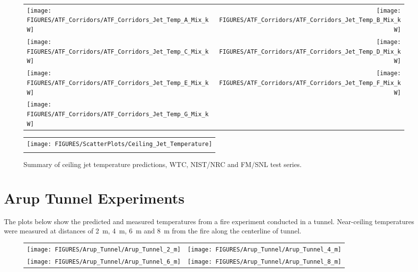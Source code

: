 \begin{figure}[p]
\begin{tabular*}{\textwidth}{l@{\extracolsep{\fill}}r}
\texttt{[image: FIGURES/ATF\_Corridors/ATF\_Corridors\_Jet\_Temp\_A\_Mix\_kW]} &
\texttt{[image: FIGURES/ATF\_Corridors/ATF\_Corridors\_Jet\_Temp\_B\_Mix\_kW]} \\
\texttt{[image: FIGURES/ATF\_Corridors/ATF\_Corridors\_Jet\_Temp\_C\_Mix\_kW]} &
\texttt{[image: FIGURES/ATF\_Corridors/ATF\_Corridors\_Jet\_Temp\_D\_Mix\_kW]} \\
\texttt{[image: FIGURES/ATF\_Corridors/ATF\_Corridors\_Jet\_Temp\_E\_Mix\_kW]} &
\texttt{[image: FIGURES/ATF\_Corridors/ATF\_Corridors\_Jet\_Temp\_F\_Mix\_kW]} \\
\texttt{[image: FIGURES/ATF\_Corridors/ATF\_Corridors\_Jet\_Temp\_G\_Mix\_kW]} &
\end{tabular*}
\label{ATF_Corridors_Jet_Temp_Mix_kW}
\end{figure}





\begin{figure}[p]
\begin{center}
\begin{tabular}{c}
\texttt{[image: FIGURES/ScatterPlots/Ceiling\_Jet\_Temperature]} \\
\vspace{0.25in}
\end{tabular}
\end{center}
\caption[Summary of ceiling jet temperature predictions, WTC, NIST/NRC and FM/SNL test series.]
{Summary of ceiling jet temperature predictions, WTC, NIST/NRC and FM/SNL test series.}
\end{figure}


\clearpage

\section{Arup Tunnel Experiments}

The plots below show the predicted and measured temperatures from a fire experiment conducted in a tunnel. Near-ceiling temperatures
were measured at distances of 2~m, 4~m, 6~m and 8~m from the fire along the centerline of tunnel.



\begin{figure}[h!]
\begin{tabular*}{\textwidth}{l@{\extracolsep{\fill}}r}
\texttt{[image: FIGURES/Arup\_Tunnel/Arup\_Tunnel\_2\_m]} &
\texttt{[image: FIGURES/Arup\_Tunnel/Arup\_Tunnel\_4\_m]} \\
\texttt{[image: FIGURES/Arup\_Tunnel/Arup\_Tunnel\_6\_m]} &
\texttt{[image: FIGURES/Arup\_Tunnel/Arup\_Tunnel\_8\_m]} 
\end{tabular*}
\label{Arup_Tunnel}
\end{figure}



